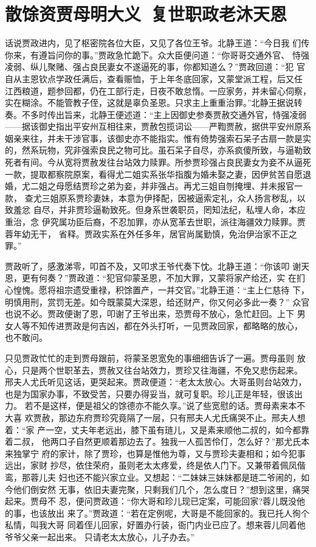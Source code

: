 \chapter{散馀资贾母明大义~复世职政老沐天恩}

话说贾政进内，见了枢密院各位大臣，又见了各位王爷。北静王道：“今日我
们传你来，有遵旨问你的事。”贾政急忙跪下。众大臣便问道：“你哥哥交通外官、
恃强凌弱、纵儿聚赌、强占良民妻女不遂逼死的事，你都知道么？”贾政回道：“犯
官自从主恩钦点学政任满后，查看赈恤，于上年冬底回家，又蒙堂派工程，后又任
江西粮道，题参回都，仍在工部行走，日夜不敢怠惰。一应家务，并未留心伺察，
实在糊涂。不能管教子侄，这就是辜负圣恩。只求主上重重治罪。”北静王据说转
奏。不多时传出旨来，北静王便述道：“主上因御史参奏贾赦交通外官，恃强凌弱
——据该御史指出平安州互相往来，贾赦包揽词讼——严鞫贾赦，据供平安州原系
姻亲来往，并未干涉官事，该御史亦不能指实。惟有倚势强索石呆子古扇一款是实
的，然系玩物，究非强索良民之物可比。虽石呆子自尽，亦系疯傻所致，与逼勒致
死者有间。今从宽将贾赦发往台站效力赎罪。所参贾珍强占良民妻女为妾不从逼死
一款，提取都察院原案，看得尤二姐实系张华指腹为婚未娶之妻，因伊贫苦自愿退
婚，尤二姐之母愿结贾珍之弟为妾，并非强占。再尤三姐自刎掩埋、并未报官一款，
查尤三姐原系贾珍妻妹，本意为伊择配，因被逼索定礼，众人扬言秽乱，以致羞忿
自尽，并非贾珍逼勒致死。但身系世袭职员，罔知法纪，私埋人命，本应重治，念
伊究属功臣后裔，不忍加罪，亦从宽革去世职，派往海疆效力赎罪。贾蓉年幼无干，
省释。贾政实系在外任多年，居官尚属勤慎，免治伊治家不正之罪。”

贾政听了，感激涕零，叩首不及，又叩求王爷代奏下忱。北静王道：“你该叩
谢天恩，更有何奏？”贾政道：“犯官仰蒙圣恩，不加大罪，又蒙将家产给还，实
在扪心惶愧。愿将祖宗遗受重禄，积馀置产，一并交官。”北静王道：“主上仁慈待
下，明慎用刑，赏罚无差。如今既蒙莫大深恩，给还财产，你又何必多此一奏？”
众官也说不必。贾政便谢了恩，叩谢了王爷出来，恐贾母不放心，急忙赶回。上下
男女人等不知传进贾政是何吉凶，都在外头打听，一见贾政回家，都略略的放心，
也不敢问。

只见贾政忙忙的走到贾母跟前，将蒙圣恩宽免的事细细告诉了一遍。贾母虽则
放心，只是两个世职革去，贾赦又往台站效力，贾珍又往海疆，不免又悲伤起来。
邢夫人尤氏听见这话，更哭起来。贾政便道：“老太太放心。大哥虽则台站效力，
也是为国家办事，不致受苦，只要办得妥当，就可复职。珍儿正是年轻，很该出力。
若不是这样，便是祖父的馀德亦不能久享。”说了些宽慰的话。贾母素来本不大喜
欢贾赦，那边东府贾珍究竟隔了一层，只有邢夫人尤氏痛哭不止。邢夫人想着：“家
产一空，丈夫年老远出，膝下虽有琏儿，又是素来顺他二叔的，如今都靠着二叔，
他两口子自然更顺着那边去了。独我一人孤苦伶仃，怎么好？”那尤氏本来独掌宁
府的家计，除了贾珍，也算是惟他为尊，又与贾珍夫妻相和；如今犯事远出，家财
抄尽，依住荣府，虽则老太太疼爱，终是依人门下。又兼带着佩凤偕鸾，那蓉儿夫
妇也还不能兴家立业。又想起：“二妹妹三妹妹都是琏二爷闹的，如今他们倒安然
无事，依旧夫妻完聚，只剩我们几个，怎么度日？”想到这里，痛哭起来。贾母不
忍，便问贾政道：“你大哥和珍儿现已定案，可能回家?蓉儿既没他的事，也该放出
来了。”贾政道：“若在定例呢，大哥是不能回家的。我已托人徇个私情，叫我大哥
同着侄儿回家，好置办行装，衙门内业已应了。想来蓉儿同着他爷爷父亲一起出来。
只请老太太放心，儿子办去。”

